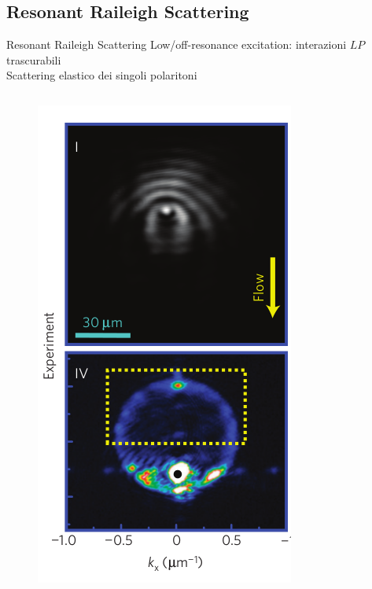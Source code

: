 \documentclass[10pt]{beamer}
\begin{document}
\subsection{Resonant Raileigh Scattering}
\begin{frame}{Resonant Raileigh Scattering}
Low/off-resonance excitation: interazioni $LP$ trascurabili\\
Scattering elastico dei singoli polaritoni
\begin{columns}[t]
  \begin{column}{.25\textwidth}
    \begin{figure}
        \includegraphics[width=\columnwidth]{pics/scattering-RRS-exp.png}

\end{figure}
\end{column}
\end{columns}
\end{frame}
\end{document}
